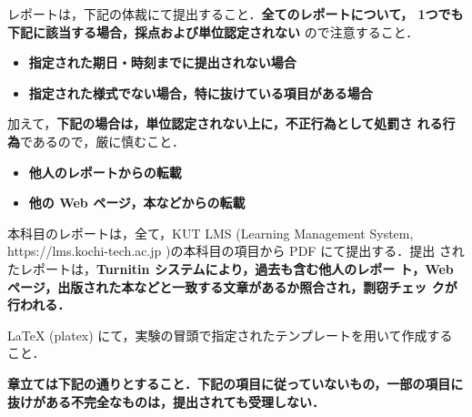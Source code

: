 

レポートは，下記の体裁にて提出すること．\textbf{全てのレポートについて，
1つでも下記に該当する場合，採点および単位認定されない} ので注意すること．

\begin{itemize}
 \item \textbf{指定された期日・時刻までに提出されない場合}
 \item \textbf{指定された様式でない場合，特に抜けている項目がある場合}
\end{itemize}

加えて，\textbf{下記の場合は，単位認定されない上に，不正行為として処罰さ
れる行為}であるので，厳に慎むこと．

\begin{itemize}
 \item \textbf{他人のレポートからの転載}
 \item \textbf{他の Web ページ，本などからの転載}
\end{itemize}

本科目のレポートは，全て，KUT LMS (Learning Management System,
https://lms.kochi-tech.ac.jp )の本科目の項目から PDF にて提出する．提出
されたレポートは，\textbf{Turnitin システムにより，過去も含む他人のレポー
ト，Webページ，出版された本などと一致する文章があるか照合され，剽窃チェッ
クが行われる．}

LaTeX (platex) にて，実験の冒頭で指定されたテンプレートを用いて作成する
こと．

\textbf{章立ては下記の通りとすること．下記の項目に従っていないもの，一部の項目に
抜けがある不完全なものは，提出されても受理しない．}

